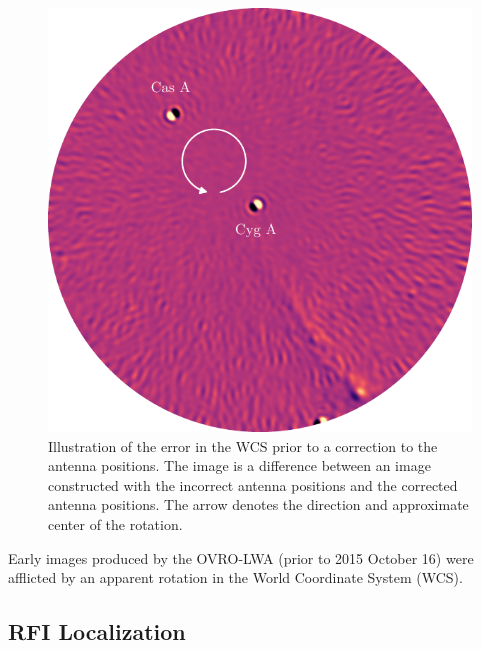 \begin{bibunit}
\begin{figure}
    \centering
    \includegraphics[width=\textwidth]{figures/chapter2/northing-easting-mistake/northing-easting-mistake}
    \caption{
        Illustration of the error in the WCS prior to a correction to the antenna positions. The
        image is a difference between an image constructed with the incorrect antenna positions and
        the corrected antenna positions. The arrow denotes the direction and approximate center of
        the rotation.
    }
    \label{fig:northing-easting-mistake}
\end{figure}

Early images produced by the OVRO-LWA (prior to 2015 October 16) were afflicted by an apparent
rotation in the World Coordinate System (WCS).

\subsection{RFI Localization}


\end{bibunit}
